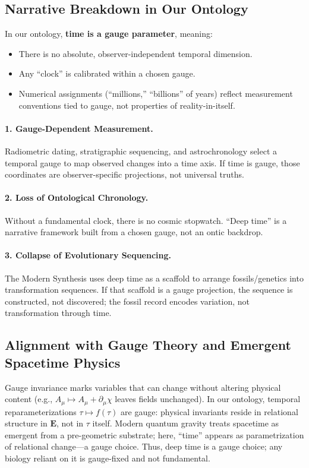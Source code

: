 \documentclass[11pt]{article}
\theoremstyle{definition}
\theoremstyle{plain}
\theoremstyle{remark}
\newcommand{\Ecat}{\mathbf{E}}      %
\begin{document}
\subsection{Narrative Breakdown in Our Ontology}
In our ontology, \textbf{time is a gauge parameter}, meaning:
\begin{itemize}
    \item There is no absolute, observer-independent temporal dimension.
    \item Any ``clock'' is calibrated within a chosen gauge.
    \item Numerical assignments (``millions,'' ``billions'' of years) reflect measurement conventions tied to gauge, not properties of reality-in-itself.
\end{itemize}

\paragraph{1. Gauge-Dependent Measurement.}
Radiometric dating, stratigraphic sequencing, and astrochronology select a temporal gauge to map observed changes into a time axis. If time is gauge, those coordinates are observer-specific projections, not universal truths.

\paragraph{2. Loss of Ontological Chronology.}
Without a fundamental clock, there is no cosmic stopwatch. ``Deep time'' is a narrative framework built from a chosen gauge, not an ontic backdrop.

\paragraph{3. Collapse of Evolutionary Sequencing.}
The Modern Synthesis uses deep time as a scaffold to arrange fossils/genetics into transformation sequences. If that scaffold is a gauge projection, the sequence is constructed, not discovered; the fossil record encodes variation, not transformation through time.

\subsection{Alignment with Gauge Theory and Emergent Spacetime Physics}
Gauge invariance marks variables that can change without altering physical content (e.g., $A_\mu\mapsto A_\mu+\partial_\mu\chi$ leaves fields unchanged). In our ontology, temporal reparameterizations $\tau\mapsto f(\tau)$ are gauge: physical invariants reside in relational structure in $\Ecat$, not in $\tau$ itself. Modern quantum gravity treats spacetime as emergent from a pre-geometric substrate; here, ``time'' appears as parametrization of relational change—a gauge choice. Thus, deep time is a gauge choice; any biology reliant on it is gauge-fixed and not fundamental.
\end{document}
